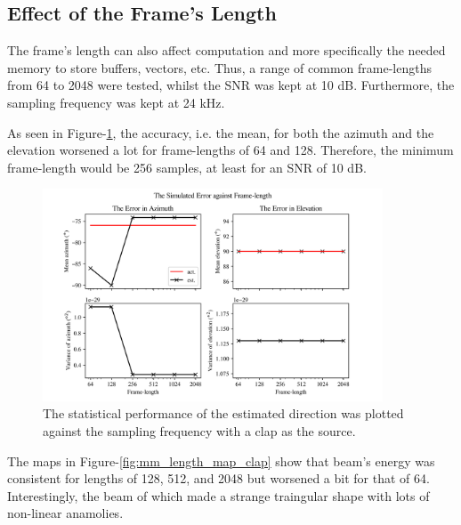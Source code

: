 \documentclass[notitlepage]{report}
\begin{document}
\subsection{Effect of the Frame's Length} \label{Effect_of_the_Frames_Length}

The frame's length can also affect computation and more specifically the needed memory to store buffers, vectors, etc. Thus, a range of common frame-lengths from 64 to 2048 were tested, whilst the SNR was kept at 10 \si{dB}. Furthermore, the sampling frequency was kept at 24 \si{kHz}.

As seen in Figure-\ref{fig:mm_length_plots_clap}, the accuracy, i.e. the mean, for both the azimuth and the elevation worsened a lot for frame-lengths of 64 and 128. Therefore, the minimum frame-length would be 256 samples, at least for an SNR of 10 \si{dB}.

\begin{figure}[H]
\includegraphics[width=0.9\textwidth]{../Python/main_method/length/clap/plots.png}
\centering
\caption{The statistical performance of the estimated direction was plotted against the sampling frequency with a clap as the source.}
\label{fig:mm_length_plots_clap}
\centering
\end{figure}

The maps in Figure-\ref{fig:mm_length_map_clap} show that beam's energy was consistent for lengths of 128, 512, and 2048 but worsened a bit for that of 64. Interestingly, the beam of which made a strange traingular shape with lots of non-linear anamolies.
\end{document}
